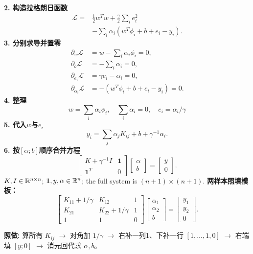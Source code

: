 \textbf{2. 构造拉格朗日函数}
\[\begin{aligned}
\mathcal L={}&\tfrac12w^Tw+\tfrac\gamma2\sum_i e_i^2\\
&-\sum_i\alpha_i(w^T\phi_i+b+e_i-y_i).
\end{aligned}\]
\textbf{3. 分别求导并置零}
\[\begin{aligned}
\partial_w\mathcal L&=w-\sum_i\alpha_i\phi_i=0,\\
\partial_b\mathcal L&=-\sum_i\alpha_i=0,\\
\partial_{e_i}\mathcal L&=\gamma e_i-\alpha_i=0,\\
\partial_{\alpha_i}\mathcal L&=-(w^T\phi_i+b+e_i-y_i)=0.
\end{aligned}\]
\textbf{4. 整理}
\[\boxed{w=\sum_i\alpha_i\phi_i,\quad\sum_i\alpha_i=0,\quad e_i=\alpha_i/\gamma}\]
\textbf{5. 代入$w$与$e_i$}
\[y_i=\sum_j\alpha_jK_{ij}+b+\gamma^{-1}\alpha_i.\]
\textbf{6. 按$[\alpha;b]$顺序合并方程}
\[\boxed{\begin{bmatrix}K+\gamma^{-1}I&\mathbf1\\
\mathbf1^T&0\end{bmatrix}\begin{bmatrix}\alpha\\b\end{bmatrix}
=\begin{bmatrix}y\\0\end{bmatrix}.}\]
$K,I\in\mathbb{R}^{n\times n}$; $\mathbf1,y,\alpha\in\mathbb{R}^n$; the full system is $(n+1)\times(n+1)$.
\textbf{两样本照填模板：}
\[\begin{bmatrix}
K_{11}+1/\gamma&K_{12}&1\\
K_{21}&K_{22}+1/\gamma&1\\1&1&0
\end{bmatrix}\begin{bmatrix}\alpha_1\\\alpha_2\\b\end{bmatrix}
=\begin{bmatrix}y_1\\y_2\\0\end{bmatrix}.\]

\textbf{照做:} 算所有 $K_{ij}$ $\to$ 对角加 $1/\gamma$ $\to$ 右补一列1、下补一行 $[1,\ldots,1,0]$ $\to$ 右端填 $[y;0]$ $\to$ 消元回代求 $\alpha,b$。

